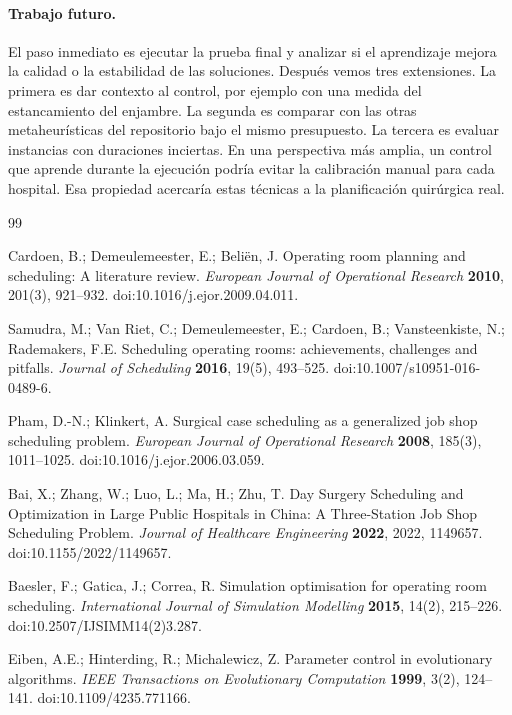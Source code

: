 \documentclass[10pt,a4paper]{article}
\begin{document}
\paragraph{Trabajo futuro.}
El paso inmediato es ejecutar la prueba final y analizar si el aprendizaje mejora la calidad o
la estabilidad de las soluciones. Después vemos tres extensiones. La primera es dar contexto al
control, por ejemplo con una medida del estancamiento del enjambre. La segunda es comparar con
las otras metaheurísticas del repositorio bajo el mismo presupuesto. La tercera es evaluar
instancias con duraciones inciertas. En una perspectiva más amplia, un control que aprende
durante la ejecución podría evitar la calibración manual para cada hospital. Esa propiedad
acercaría estas técnicas a la planificación quirúrgica real.

\begin{thebibliography}{99}\small
\setlength{\itemsep}{2pt}

 Cardoen, B.; Demeulemeester, E.; Beliën, J. Operating room planning and
scheduling: A literature review. \emph{European Journal of Operational Research} \textbf{2010},
201(3), 921--932. doi:10.1016/j.ejor.2009.04.011.

 Samudra, M.; Van Riet, C.; Demeulemeester, E.; Cardoen, B.; Vansteenkiste, N.;
Rademakers, F.E. Scheduling operating rooms: achievements, challenges and pitfalls.
\emph{Journal of Scheduling} \textbf{2016}, 19(5), 493--525. doi:10.1007/s10951-016-0489-6.

 Pham, D.-N.; Klinkert, A. Surgical case scheduling as a generalized job shop
scheduling problem. \emph{European Journal of Operational Research} \textbf{2008}, 185(3),
1011--1025. doi:10.1016/j.ejor.2006.03.059.

 Bai, X.; Zhang, W.; Luo, L.; Ma, H.; Zhu, T. Day Surgery Scheduling and
Optimization in Large Public Hospitals in China: A Three-Station Job Shop Scheduling Problem.
\emph{Journal of Healthcare Engineering} \textbf{2022}, 2022, 1149657. doi:10.1155/2022/1149657.

 Baesler, F.; Gatica, J.; Correa, R. Simulation optimisation for operating room
scheduling. \emph{International Journal of Simulation Modelling} \textbf{2015}, 14(2), 215--226.
doi:10.2507/IJSIMM14(2)3.287.

 Eiben, A.E.; Hinterding, R.; Michalewicz, Z. Parameter control in evolutionary
algorithms. \emph{IEEE Transactions on Evolutionary Computation} \textbf{1999}, 3(2), 124--141.
doi:10.1109/4235.771166.


\end{thebibliography}
\end{document}
